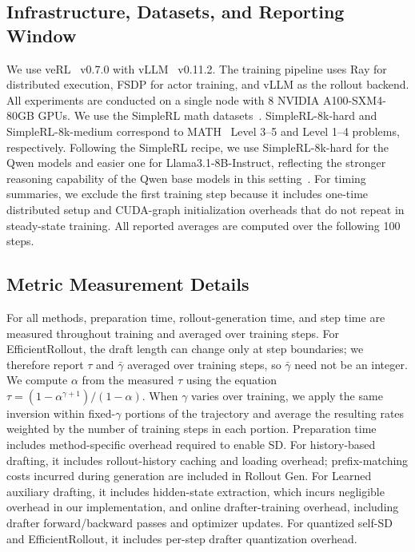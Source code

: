 \documentclass{llmxive}
\providecommand{\methodtitle}{EfficientRollout}
\providecommand{\alwayssd}{quantized self-SD}
\providecommand{\history}{history-based drafting}
\providecommand{\Learned}{Learned auxiliary drafting}
\providecommand{\DraftLength}{\gamma}
\providecommand{\mal}{\tau}
\begin{document}
\subsection{Infrastructure, Datasets, and Reporting Window}
\label{app:infra_dataset_reporting}

We use veRL~\cite{sheng2025hybridflow} v0.7.0 with vLLM~\cite{kwon2023efficient} v0.11.2.
The training pipeline uses Ray for distributed execution, FSDP for actor training, and vLLM as the rollout backend.
All experiments are conducted on a single node with 8 NVIDIA A100-SXM4-80GB GPUs.
We use the SimpleRL math datasets~\cite{zeng2025simplerl}.
SimpleRL-8k-hard and SimpleRL-8k-medium correspond to MATH~\cite{hendrycks2021measuring} Level 3--5 and Level 1--4 problems, respectively.
Following the SimpleRL recipe, we use SimpleRL-8k-hard for the Qwen models and easier one for Llama3.1-8B-Instruct, reflecting the stronger reasoning capability of the Qwen base models in this setting~\cite{zeng2025simplerl}.
For timing summaries, we exclude the first training step because it includes one-time distributed setup and CUDA-graph initialization overheads that do not repeat in steady-state training.
All reported averages are computed over the following 100 steps.


\subsection{Metric Measurement Details}
\label{app:metric_measurement}

For all methods, preparation time, rollout-generation time, and step time are measured throughout training and averaged over training steps.
For \methodtitle{}, the draft length can change only at step boundaries; we therefore report $\mal$ and $\bar{\gamma}$ averaged over training steps, so $\bar{\gamma}$ need not be an integer.
We compute $\alpha$ from the measured $\mal$ using the equation $\mal=(1-\alpha^{\DraftLength+1})/(1-\alpha)$.
When $\gamma$ varies over training, we apply the same inversion within fixed-$\gamma$ portions of the trajectory and average the resulting rates weighted by the number of training steps in each portion.
Preparation time includes method-specific overhead required to enable SD.
For \history{}, it includes rollout-history caching and loading overhead; prefix-matching costs incurred during generation are included in Rollout Gen.
For \Learned{}, it includes hidden-state extraction, which incurs negligible overhead in our implementation, and online drafter-training overhead, including drafter forward/backward passes and optimizer updates.
For \alwayssd{} and \methodtitle{}, it includes per-step drafter quantization overhead.
\end{document}
